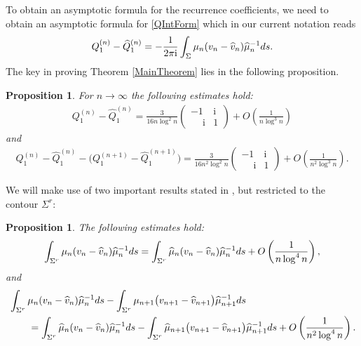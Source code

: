\documentclass[11pt]{article}
\numberwithin{equation}{section}
\newcommand{\bQ}{ Q}
\newcommand{\hQ}{{\widehat Q}}
\newcommand{\bmu}{{\mu}}
\newcommand{\hmu}{{\widehat \mu}}
\newcommand{\bv}{v}
\newcommand{\hv}{{\widehat v}}
\newcommand{\Sigr}{\Sigma^r}
\newcommand{\I}{\mathrm{i}}
\newtheorem{Proposition}[Theorem]{Proposition}
 { \theoremstyle{definition}
\newtheorem{Definition}[Theorem]{Definition}
\newtheorem{Note}[Theorem]{Note}
\newtheorem{Example}[Theorem]{Example}
\newtheorem{Remark}[Theorem]{Remark} }
\numberwithin{equation}{section}
\begin{document}
To obtain an asymptotic formula for the recurrence coefficients, we need to obtain an asymptotic formula for \eqref{QIntForm} which in our current notation reads
\begin{align}\label{QQ1}
 \bQ_1^{(n)} - \hQ_1^{(n)} = - \frac{1}{2\pi\I} \int_\Sigma \bmu_n(\bv_n-\hv_n)\hmu^{-1}_n {\rm d}s.
\end{align}
The key in proving Theorem \ref{MainTheorem} lies in the following proposition.
\begin{Proposition}\label{QQ}
For $n \to \infty$ the following estimates hold:
\begin{align*}
 \bQ_1^{(n)} - \hQ_1^{(n)} = \frac{3}{16n \log^2n} \begin{pmatrix}
-1 & \I\\
\phantom{-}\I & 1
\end{pmatrix} + O\left(\frac{1}{n\log^3 n}\right)
\end{align*}
and
\begin{align} \label{QDiffFormula2}
 \bQ_1^{(n)} - \hQ_1^{(n)} - \big(\bQ_1^{(n+1)} - \hQ_1^{(n+1)}\big) = \frac{3}{16n^2 \log^2n} \begin{pmatrix}
-1 & \I\\
\phantom{-}\I & 1
\end{pmatrix} + O\left(\frac{1}{n^2\log^3 n}\right).
\end{align}
\end{Proposition}
We will make use of two important results stated in \cite[Section~5.2]{CD}, but restricted to the contour $\Sigr$:
\begin{Proposition}\label{IntegralEst1}
The following estimates hold:
\begin{align}\label{LegendreSubstitution1}
 \int_{\Sigr} \bmu_n(\bv_n-\hv_n)\hmu_n^{-1} {\rm d}s = \int_{\Sigr} \hmu_n(\bv_n-\hv_n)\hmu_n^{-1} {\rm d}s + O\left(\frac{1}{n\log^4 n}\right),
\end{align}
and
\begin{align}
 & \int_{\Sigr} \bmu_n(\bv_n-\hv_n)\hmu^{-1}_n {\rm d}s - \int_{\Sigr} \bmu_{n+1}\big(\bv_{n+1}-\hv_{n+1}\big)\hmu^{-1}_{n+1} {\rm d}s
\nonumber \\
 &\qquad=\int_{\Sigr} \hmu_n(\bv_n-\hv_n)\hmu^{-1}_n {\rm d}s - \int_{\Sigr} \hmu_{n+1}\big(\bv_{n+1}-\hv_{n+1}\big)\hmu^{-1}_{n+1} {\rm d}s + O\left(\frac{1}{n^2\log^4 n}\right).\label{LegendreSubstitution2}
\end{align}
\end{Proposition}
\end{document}
